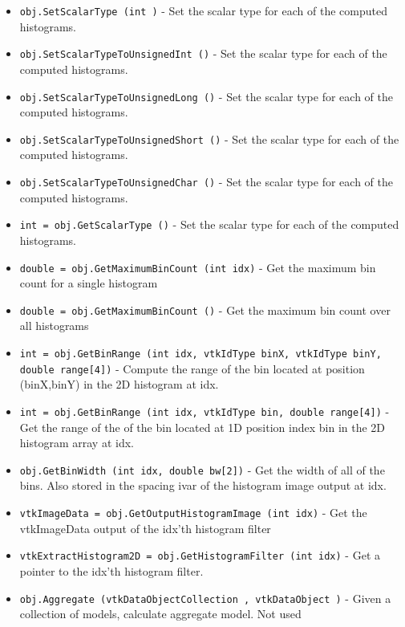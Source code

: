 \begin{itemize}
\item  \verb|obj.SetScalarType (int )| -  Set the scalar type for each of the computed histograms.

\item  \verb|obj.SetScalarTypeToUnsignedInt ()| -  Set the scalar type for each of the computed histograms.

\item  \verb|obj.SetScalarTypeToUnsignedLong ()| -  Set the scalar type for each of the computed histograms.

\item  \verb|obj.SetScalarTypeToUnsignedShort ()| -  Set the scalar type for each of the computed histograms.

\item  \verb|obj.SetScalarTypeToUnsignedChar ()| -  Set the scalar type for each of the computed histograms.

\item  \verb|int = obj.GetScalarType ()| -  Set the scalar type for each of the computed histograms.

\item  \verb|double = obj.GetMaximumBinCount (int idx)| -  Get the maximum bin count for a single histogram

\item  \verb|double = obj.GetMaximumBinCount ()| -  Get the maximum bin count over all histograms

\item  \verb|int = obj.GetBinRange (int idx, vtkIdType binX, vtkIdType binY, double range[4])| -  Compute the range of the bin located at position (binX,binY) in
 the 2D histogram at idx.

\item  \verb|int = obj.GetBinRange (int idx, vtkIdType bin, double range[4])| -  Get the range of the of the bin located at 1D position index bin
 in the 2D histogram array at idx.

\item  \verb|obj.GetBinWidth (int idx, double bw[2])| -  Get the width of all of the bins. Also stored in the spacing
 ivar of the histogram image output at idx.

\item  \verb|vtkImageData = obj.GetOutputHistogramImage (int idx)| -  Get the vtkImageData output of the idx'th histogram filter

\item  \verb|vtkExtractHistogram2D = obj.GetHistogramFilter (int idx)| -  Get a pointer to the idx'th histogram filter.

\item  \verb|obj.Aggregate (vtkDataObjectCollection , vtkDataObject )| -  Given a collection of models, calculate aggregate model.  Not used

\end{itemize}
